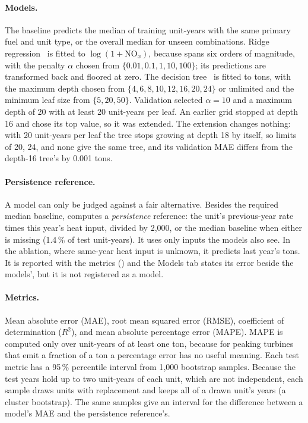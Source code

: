 \documentclass[11pt,a4paper]{article}
\begin{document}
\paragraph{Models.} The baseline predicts the median \NOx{} of training unit-years with the same
primary fuel and unit type, or the overall median for unseen combinations. Ridge
regression~\cite{hoerl1970ridge} is fitted to $\log(1 + \text{NO}_x)$, because \NOx{} spans six
orders of magnitude, with the penalty $\alpha$ chosen from $\{0.01, 0.1, 1, 10, 100\}$; its
predictions are transformed back and floored at zero. The decision tree~\cite{breiman1984cart}
is fitted to tons, with the maximum depth chosen from $\{4, 6, 8, 10, 12, 16, 20, 24\}$ or
unlimited and the minimum leaf size from $\{5, 20, 50\}$. Validation selected $\alpha = 10$ and a
maximum depth of 20 with at least 20 unit-years per leaf. An earlier grid stopped at depth 16 and
chose its top value, so it was extended. The extension changes nothing: with 20 unit-years per
leaf the tree stops growing at depth 18 by itself, so limits of 20, 24, and none give the same
tree, and its validation MAE differs from the depth-16 tree's by 0.001 tons.

\paragraph{Persistence reference.} A model can only be judged against a fair alternative. Besides
the required median baseline,  computes a \emph{persistence} reference: the unit's
previous-year \NOx{} rate times this year's heat input, divided by 2{,}000, or the median
baseline when either is missing (1.4\,\% of test unit-years). It uses only inputs the models
also see. In the ablation, where same-year heat input is unknown, it predicts last year's tons.
It is reported with the metrics () and the Models tab states its
error beside the models', but it is not registered as a model.

\paragraph{Metrics.} Mean absolute error (MAE), root mean squared error (RMSE), coefficient of
determination ($R^2$), and mean absolute percentage error (MAPE). MAPE is computed only over
unit-years of at least one ton, because for peaking turbines that emit a fraction of a ton a
percentage error has no useful meaning. Each test metric has a 95\,\% percentile interval from
1{,}000 bootstrap samples. Because the test years hold up to two unit-years of each unit, which
are not independent, each sample draws units with replacement and keeps all of a drawn unit's
years (a cluster bootstrap). The same samples give an interval for the difference between a
model's MAE and the persistence reference's.
\end{document}
